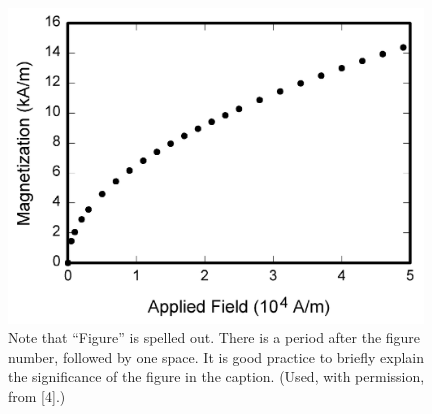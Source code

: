 \documentclass{IEEEcsmag}
\begin{document}
\begin{figure}
\centerline{\includegraphics[width=26pc]{fig1.png}}
\caption{Note that ``Figure'' is spelled out. There is a period after the figure number, followed by one space. It is good practice to briefly explain the significance of the figure in the caption. (Used, with permission, from [4].)}
\end{figure}
\end{document}
